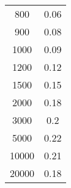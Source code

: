 \begin{table}
\begin{tabular}{c c}
                800   &   0.06 \\          
                900   &   0.08 \\           
                1000  &   0.09 \\              
                1200  &   0.12 \\             
                1500  &   0.15 \\             
                2000  &   0.18 \\             
                3000  &   0.2 \\              
                5000  &   0.22 \\             
                10000 &   0.21 \\              
                20000 &   0.18 \\       
                \bottomrule
            \end{tabular}
            \end{table}

